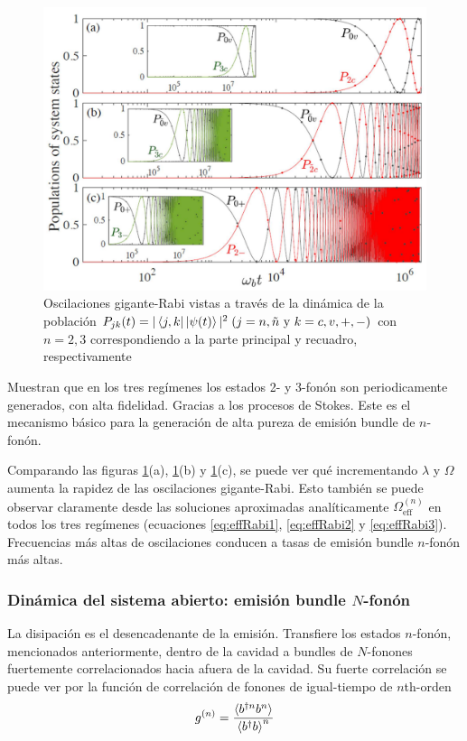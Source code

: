 \documentclass[../main.tex]{subfiles}
\begin{document}
\begin{figure}[th]
	\centering
	\includegraphics[width=0.7\linewidth]{img/super-Rabi}
	\caption{Oscilaciones gigante-Rabi vistas a través de la dinámica de la población $P_{jk}(t) = |\bra{j,k}\ket{\psi(t)}|^2\; (j=n,\tilde{n} \text{ y } k=c,v,+,-)$ con $n=2,3$ correspondiendo a la parte principal y recuadro, respectivamente \parencite{Bin2020}}
	\label{fig:super-rabi}
\end{figure}

Muestran que en los tres regímenes los estados 2- y 3-fonón son periodicamente generados, con alta fidelidad. Gracias a los procesos de Stokes. Este es el mecanismo básico para la generación de alta pureza de emisión bundle de $n$-fonón.

Comparando las figuras \ref{fig:super-rabi}(a), \ref{fig:super-rabi}(b) y \ref{fig:super-rabi}(c), se puede ver qué incrementando $\lambda$ y $\Omega$ aumenta la rapidez de las oscilaciones gigante-Rabi. Esto también se puede observar claramente desde las soluciones aproximadas analíticamente $\Omega_\text{eff}^{(n)}$ en todos los tres regímenes (ecuaciones \ref{eq:effRabi1}, \ref{eq:effRabi2} y \ref{eq:effRabi3}). Frecuencias más altas de oscilaciones conducen a tasas de emisión bundle $n$-fonón más altas.

\subsubsection{Dinámica del sistema abierto: emisión bundle $N$-fonón}
La disipación es el desencadenante de la emisión. Transfiere los estados $n$-fonón, mencionados anteriormente, dentro de la cavidad a bundles de $N$-fonones fuertemente correlacionados hacia afuera de la cavidad. Su fuerte correlación se puede ver por la función de correlación de fonones de igual-tiempo de $n$th-orden
\begin{equation}
	g^{(n)} = \frac{\braket{b^{\dagger n}b^n}}{\braket{b^\dagger b}^n}
\end{equation}
\end{document}
